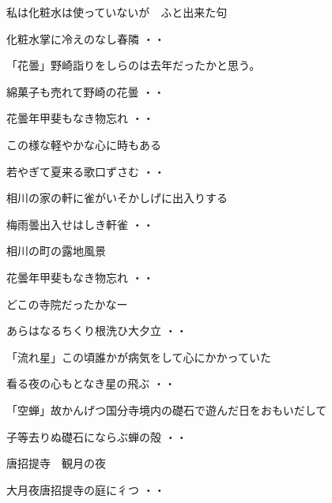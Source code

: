 \documentclass[b5paper]{tbook}
\begin{document}
\vspace{0.6cm}
私は化粧水は使っていないが　ふと出来た句
\begin{shiika}化粧水掌に冷えのなし春隣
\hfill{・・}\end{shiika}
\vspace{0.6cm}
「花曇」野崎詣りをしらのは去年だったかと思う。
\begin{shiika}綿菓子も売れて野崎の花曇
\hfill{・・}\end{shiika}
\begin{shiika}花曇年甲斐もなき物忘れ
\hfill{・・}\end{shiika}
\vspace{0.6cm}
この様な軽やかな心に時もある
\begin{shiika}若やぎて夏来る歌口ずさむ
\hfill{・・}\end{shiika}
\vspace{0.6cm}
相川の家の軒に雀がいそかしげに出入りする
\begin{shiika}梅雨曇出入せはしき軒雀
\hfill{・・}\end{shiika}
\vspace{0.6cm}
相川の町の露地風景
\begin{shiika}花曇年甲斐もなき物忘れ
\hfill{・・}\end{shiika}
\vspace{0.6cm}
どこの寺院だったかなー
\begin{shiika}あらはなるちくり根洗ひ大夕立
\hfill{・・}\end{shiika}
\vspace{0.6cm}
「流れ星」この頃誰かが病気をして心にかかっていた
\begin{shiika}看る夜の心もとなき星の飛ぶ
\hfill{・・}\end{shiika}
\vspace{0.6cm}
「空蝉」故かんげつ国分寺境内の礎石で遊んだ日をおもいだして
\begin{shiika}子等去りぬ礎石にならぶ蝉の殻
\hfill{・・}\end{shiika}
\vspace{0.6cm}
唐招提寺　観月の夜
\begin{shiika}大月夜唐招提寺の庭に彳つ
\hfill{・・}\end{shiika}
\end{document}
